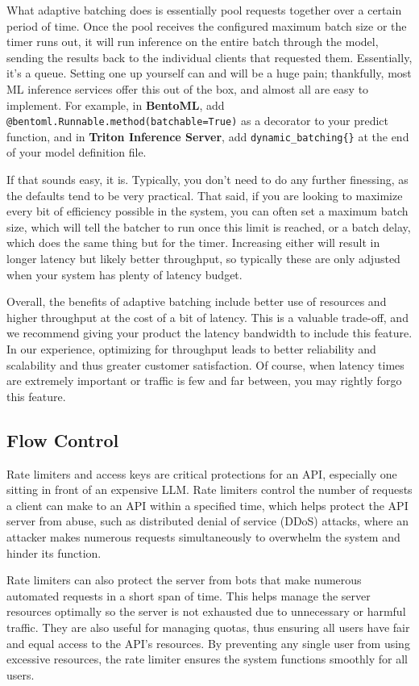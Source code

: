 What adaptive batching does is essentially pool requests together over a certain period of time. Once the pool receives the configured maximum batch size or the timer runs out, it will run inference on the entire batch through the model, sending the results back to the individual clients that requested them. Essentially, it's a queue. Setting one up yourself can and will be a huge pain; thankfully, most ML inference services offer this out of the box, and almost all are easy to implement. For example, in \textbf{BentoML}, add \texttt{@bentoml.Runnable.method(batchable=True)} as a decorator to your predict function, and in \textbf{Triton Inference Server}, add \texttt{dynamic\_batching\{\}} at the end of your model definition file.

If that sounds easy, it is. Typically, you don't need to do any further finessing, as the defaults tend to be very practical. That said, if you are looking to maximize every bit of efficiency possible in the system, you can often set a maximum batch size, which will tell the batcher to run once this limit is reached, or a batch delay, which does the same thing but for the timer. Increasing either will result in longer latency but likely better throughput, so typically these are only adjusted when your system has plenty of latency budget.

Overall, the benefits of adaptive batching include better use of resources and higher throughput at the cost of a bit of latency. This is a valuable trade-off, and we recommend giving your product the latency bandwidth to include this feature. In our experience, optimizing for throughput leads to better reliability and scalability and thus greater customer satisfaction. Of course, when latency times are extremely important or traffic is few and far between, you may rightly forgo this feature.

\subsection{Flow Control}
Rate limiters and access keys are critical protections for an API, especially one sitting in front of an expensive LLM. Rate limiters control the number of requests a client can make to an API within a specified time, which helps protect the API server from abuse, such as distributed denial of service (DDoS) attacks, where an attacker makes numerous requests simultaneously to overwhelm the system and hinder its function.  

Rate limiters can also protect the server from bots that make numerous automated requests in a short span of time. This helps manage the server resources optimally so the server is not exhausted due to unnecessary or harmful traffic. They are also useful for managing quotas, thus ensuring all users have fair and equal access to the API's resources. By preventing any single user from using excessive resources, the rate limiter ensures the system functions smoothly for all users. 

